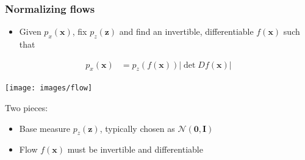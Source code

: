 \documentclass[10pt,aspectratio=169]{beamer}
\begin{document}
\begin{frame}
  \frametitle{Normalizing flows}
\small{
\begin{itemize}
\item
Given $p_x(\mathbf{x})$, fix $p_z(\mathbf{z})$ and find an invertible, differentiable $f(\mathbf{x})$ such that
\end{itemize}
\begin{align*}
p_x(\mathbf{x}) & = p_z(f(\mathbf{x}))|\det Df(\mathbf{x}) |
\end{align*}
}
\begin{center}
\texttt{[image: images/flow]}
\end{center}
Two pieces:
\begin{itemize}
\item Base measure $p_z(\mathbf{z})$, typically chosen as $\mathcal{N}(\mathbf{0},\mathbf{I})$
\item Flow $f(\mathbf{x})$ must be invertible and differentiable
\end{itemize}
\end{frame}
\end{document}
